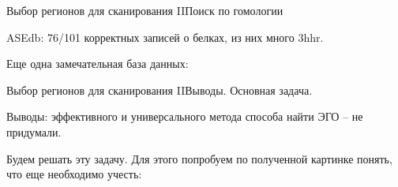 \documentclass[12pt, xcolor={dvipsnames}]{beamer}
\begin{document}
\begin{frame}{Выбор регионов для сканирования II}{Поиск по гомологии}

ASEdb: 76/101 корректных записей о белках, из них много 3hhr.

Еще одна замечательная база данных:
\begin{center}
\end{center}
\end{frame}

\begin{frame}{Выбор регионов для сканирования II}{Выводы. Основная задача.}

Выводы: эффективного и универсального метода способа найти ЭГО -- не придумали.

Будем решать эту задачу. Для этого попробуем по полученной картинке понять, что еще необходимо учесть:
\begin{center}
\end{center}
\end{frame}
\end{document}
